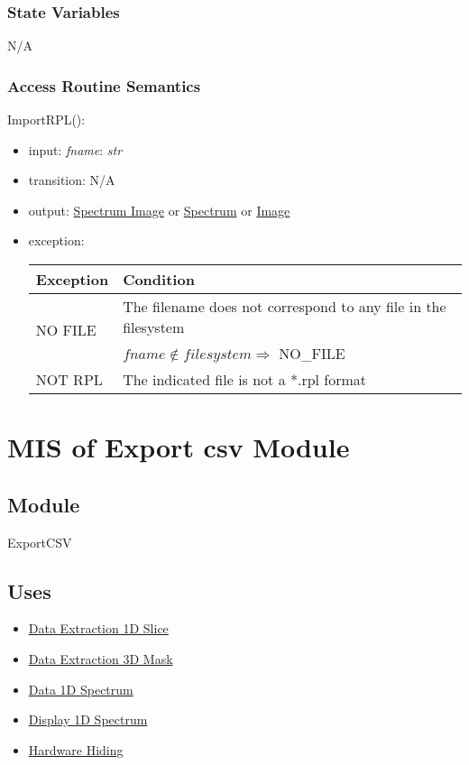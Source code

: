 \documentclass[12pt, titlepage]{article}
\begin{document}
\subsubsection{State Variables}
N/A

\subsubsection{Access Routine Semantics}

\noindent ImportRPL():
\begin{itemize}
    \item input: \textit{fname}: \textit{str}
    \item transition: N/A
    \item output: \hyperref[Mod:SI]{Spectrum Image} or \hyperref[Mod:Spectrum]{Spectrum} or \hyperref[Mod:Image]{Image}
    \item exception: 
    \begin{center}
        \begin{tabular}{p{3cm} p{12cm}}
            \toprule[0.15em]
            \textbf{Exception} & \textbf{Condition}\\
            \midrule[0.1em]
            \multirow{2}{0.25\textwidth}{NO FILE} & The filename does not correspond to any file in the filesystem\\ 
            & $fname \notin filesystem \Rightarrow$ NO\_FILE\\ 
            \midrule[0.05em]
            NOT RPL & The indicated file is not a *.rpl format\\
            \bottomrule[0.15em]
        \end{tabular}
    \end{center}
\end{itemize}

\section{MIS of Export csv Module} \label{Mod:ExportCSV}

\subsection{Module}

ExportCSV

\subsection{Uses}
\begin{itemize}
    \item \hyperref[Mod:Slice1D]{Data Extraction 1D Slice}
    \item \hyperref[Mod:Mask3D]{Data Extraction 3D Mask}
    \item \hyperref[Mod:Spectrum]{Data 1D Spectrum}
    \item \hyperref[Mod:Disp1D]{Display 1D Spectrum}
    \item \hyperref[Mod:HH]{Hardware Hiding}
\end{itemize}
\end{document}
